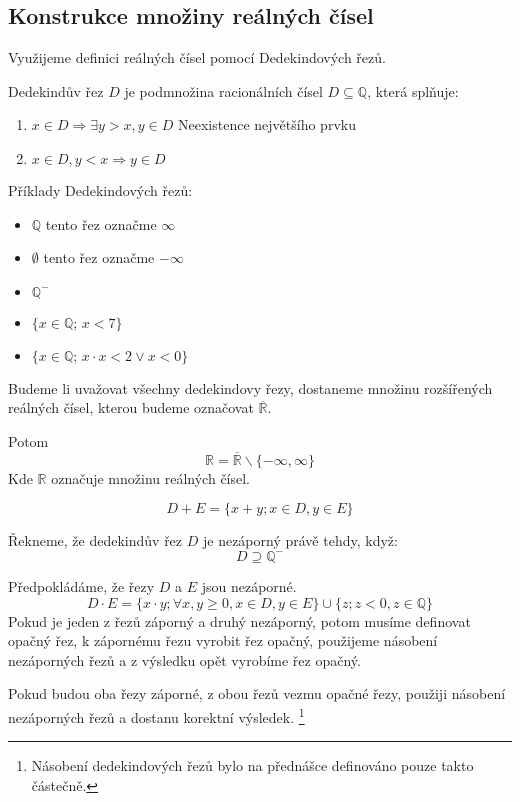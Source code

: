 \subsection{Konstrukce množiny reálných čísel}
Využijeme definici reálných čísel pomocí Dedekindových řezů.

\begin{definition}
    Dedekindův řez $D$ je podmnožina racionálních čísel $D \subseteq \mathbb{Q}$, která splňuje:
    \begin{enumerate}
        \item $x \in D \Rightarrow \exists y > x, y \in D$ \hfill Neexistence největšího prvku
        \item $x \in D, y < x \Rightarrow y \in D$ \hfill
    \end{enumerate}
\end{definition}

Příklady Dedekindových řezů:
\begin{itemize}
    \item $\mathbb{Q}$ tento řez označme $\infty$
    \item $\emptyset$ tento řez označme $- \infty$
    \item $\mathbb{Q}^{-}$
    \item $\{x \in \mathbb{Q};\,x < 7\}$
    \item $\{x \in \mathbb{Q};\, x \cdot x < 2 \vee x < 0\}$
\end{itemize}

Budeme li uvažovat všechny dedekindovy řezy, dostaneme množinu rozšířených reálných
čísel, kterou budeme označovat $\overline{\mathbb{R}}$.

Potom $$\mathbb{R} = \overline{\mathbb{R}} \smallsetminus \{-\infty, \infty\}$$
Kde $\mathbb{R}$ označuje množinu reálných čísel.

\begin{definition}
    $$D + E = \{x + y; x\in D, y \in E\}$$
\end{definition}

\begin{definition}
    Řekneme, že dedekindův řez $D$ je nezáporný právě tehdy, když:
    $$D \supseteq \mathbb{Q}^{-}$$
\end{definition}

\begin{definition}
    Předpokládáme, že řezy $D$ a $E$ jsou nezáporné.
    $$D \cdot E = \{x \cdot y; \forall x, y \geq 0, x \in D, y \in E\} \cup \{z; z < 0, z \in \mathbb{Q}\}$$
    Pokud je jeden z řezů záporný a druhý nezáporný, potom musíme definovat opačný řez,
    k zápornému řezu vyrobit řez opačný, použijeme násobení nezáporných řezů a z výsledku opět vyrobíme
    řez opačný.

    Pokud budou oba řezy záporné, z obou řezů vezmu opačné řezy, použiji násobení nezáporných řezů
    a dostanu korektní výsledek. \footnote{Násobení dedekindových řezů bylo na přednášce definováno
    pouze takto částečně.}
\end{definition}

